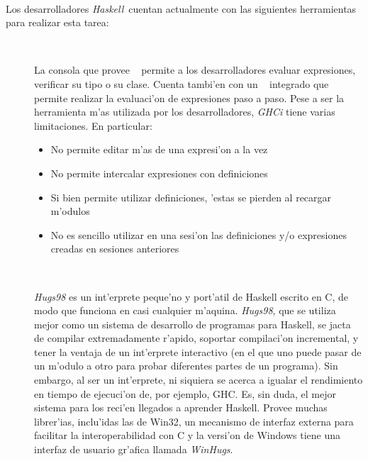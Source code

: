 \documentclass[a4paper]{article}
\newcommand{\haskell}{\textsl{Haskell}}
\begin{document}
\paragraph{}Los desarrolladores \haskell\ cuentan actualmente con las siguientes herramientas para realizar esta tarea:
\begin{description}
	\item[~\cite{ghci}]
		La consola que provee ~\cite{ghc} permite a los desarrolladores evaluar expresiones, verificar su tipo o su clase.  Cuenta tambi'en con un ~\cite{ghcdebug} integrado que permite realizar la evaluaci'on de expresiones paso a paso.  Pese a ser la herramienta m'as utilizada por los desarrolladores, \textit{GHCi} tiene varias limitaciones.  En particular:
		\begin{itemize}
			\item No permite editar m'as de una expresi'on a la vez
			\item No permite intercalar expresiones con definiciones
			\item	Si bien permite utilizar definiciones, 'estas se pierden al recargar m'odulos
			\item No es sencillo utilizar en una sesi'on las definiciones y/o expresiones creadas en sesiones anteriores
		\end{itemize}
	\item[~\cite{hugs}]
		\textsl{Hugs98} es un int'erprete peque'no y port'atil de Haskell escrito en C, de modo que funciona en casi cualquier m'aquina. \textsl{Hugs98}, que se utiliza mejor como un sistema de desarrollo de programas para Haskell, se jacta de compilar extremadamente r'apido, soportar compilaci'on incremental, y tener la ventaja de un int'erprete interactivo (en el que uno puede pasar de un m'odulo a otro para probar diferentes partes de un programa).  Sin embargo, al ser un int'erprete, ni siquiera se acerca a igualar el rendimiento en tiempo de ejecuci'on de, por ejemplo, GHC.  Es, sin duda, el mejor sistema para los reci'en llegados a aprender Haskell.  Provee muchas librer'ias, inclu'idas las de Win32, un mecanismo de interfaz externa para facilitar la interoperabilidad con C y la versi'on de Windows tiene una interfaz de usuario gr'afica llamada \textsl{WinHugs}.

\end{description}
\end{document}
